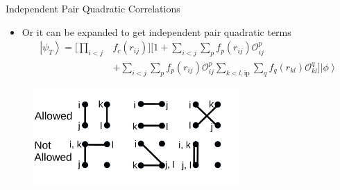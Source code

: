 \documentclass{beamer}
\newcommand{\ket}[1]{\left| #1 \right>}
\newcommand{\fpij}{f_p(r_{ij})}
\newcommand{\Opij}{\mathcal{O}_{ij}^p}
\newcommand{\fOpij}{\sum\limits_{i<j}\sum\limits_p \fpij\Opij}
\newcommand{\fqkl}{f_q(r_{kl})}
\newcommand{\Oqkl}{\mathcal{O}_{kl}^q}
\newcommand{\fOqklip}{\sum\limits_{k<l,\mathrm{ip}}\sum\limits_q \fqkl\Oqkl}
\begin{document}
\begin{frame}{Independent Pair Quadratic Correlations}
\begin{itemize}
   \item Or it can be expanded to get independent pair quadratic terms
   \begin{equation*}
   \begin{split}
      \ket{\psi_T} = \Bigg[\prod\limits_{i<j}&f_c(r_{ij})\Bigg] \Bigg[1+\fOpij \\
      & + \fOpij\fOqklip \Bigg] \ket{\phi}
   \end{split}
   \end{equation*}
\end{itemize}
\begin{figure}[h]
   \centering
   \includegraphics[width=0.7\textwidth]{../figures/pairing.pdf}
\end{figure}
\end{frame}
\end{document}
